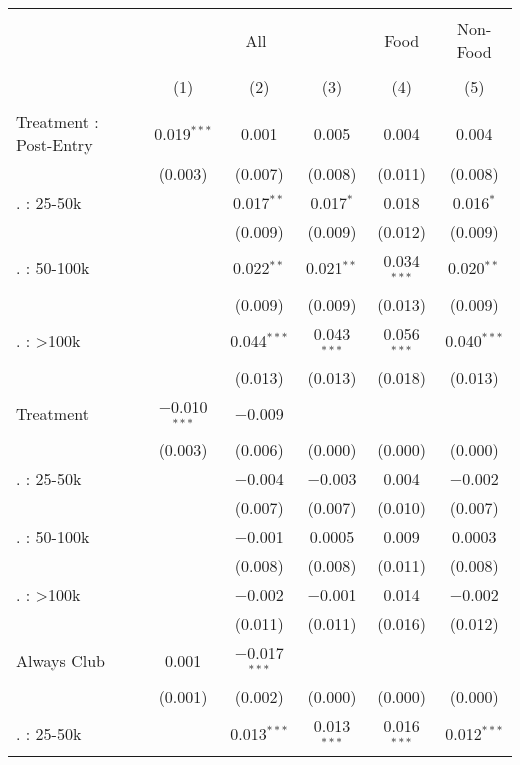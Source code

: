 
\begin{table}[!htbp] \centering 
  \caption{} 
  \label{} 
\begin{tabular}{@{\extracolsep{5pt}}lccccc} 
\\[-1.8ex]\hline 
\hline \\[-1.8ex] 
 & \multicolumn{3}{c}{All} & Food & Non-Food \\ 
\\[-1.8ex] & (1) & (2) & (3) & (4) & (5)\\ 
\hline \\[-1.8ex] 
 Treatment : Post-Entry & 0.019$^{***}$ & 0.001 & 0.005 & 0.004 & 0.004 \\ 
  & (0.003) & (0.007) & (0.008) & (0.011) & (0.008) \\ 
   . : 25-50k &  & 0.017$^{**}$ & 0.017$^{*}$ & 0.018 & 0.016$^{*}$ \\ 
  &  & (0.009) & (0.009) & (0.012) & (0.009) \\ 
   . : 50-100k &  & 0.022$^{**}$ & 0.021$^{**}$ & 0.034$^{***}$ & 0.020$^{**}$ \\ 
  &  & (0.009) & (0.009) & (0.013) & (0.009) \\ 
   . : >100k &  & 0.044$^{***}$ & 0.043$^{***}$ & 0.056$^{***}$ & 0.040$^{***}$ \\ 
  &  & (0.013) & (0.013) & (0.018) & (0.013) \\ 
  Treatment & $-$0.010$^{***}$ & $-$0.009 &  &  &  \\ 
  & (0.003) & (0.006) & (0.000) & (0.000) & (0.000) \\ 
   . : 25-50k &  & $-$0.004 & $-$0.003 & 0.004 & $-$0.002 \\ 
  &  & (0.007) & (0.007) & (0.010) & (0.007) \\ 
   . : 50-100k &  & $-$0.001 & 0.0005 & 0.009 & 0.0003 \\ 
  &  & (0.008) & (0.008) & (0.011) & (0.008) \\ 
   . : >100k &  & $-$0.002 & $-$0.001 & 0.014 & $-$0.002 \\ 
  &  & (0.011) & (0.011) & (0.016) & (0.012) \\ 
  Always Club & 0.001 & $-$0.017$^{***}$ &  &  &  \\ 
  & (0.001) & (0.002) & (0.000) & (0.000) & (0.000) \\ 
   . : 25-50k &  & 0.013$^{***}$ & 0.013$^{***}$ & 0.016$^{***}$ & 0.012$^{***}$ \\ 

\end{tabular}
\end{table}
